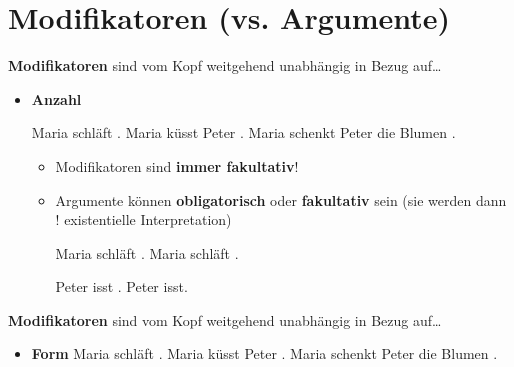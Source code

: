 \section{Modifikatoren (vs. Argumente)}

\begin{frame}

\textbf{Modifikatoren} sind vom Kopf weitgehend unabhängig in Bezug auf\dots

\begin{itemize}
	\item \textbf{Anzahl}

\eal 
\ex Maria schläft \alertred{[heute] [im Zimmer] [unruhig]}.
\ex Maria küsst Peter \alertred{[heute] [im Zimmer] [unruhig]}.
\ex Maria schenkt Peter die Blumen \alertred{[heute] [im Zimmer] [unruhig]}.
\zl

	\begin{itemize}
		\item Modifikatoren sind \textbf{immer fakultativ}!
		\item Argumente können \textbf{obligatorisch} oder \textbf{fakultativ} sein (sie werden dann ! \ras existentielle Interpretation)
		
		\eal 
		\ex Maria schläft \alertred{[heute] [im Zimmer]}.
		\ex Maria schläft \alertred{[im Zimmer]}. 
		\zl
		
		\eal 
		\ex Peter isst .
		\ex Peter isst. 
		\zl
		
	\end{itemize}

\end{itemize}

\end{frame}


\begin{frame}

\textbf{Modifikatoren} sind vom Kopf weitgehend unabhängig in Bezug auf\dots

\begin{itemize}
	
	\item \textbf{Form}
\eal
\ex Maria schläft .
\ex Maria küsst Peter .
\ex Maria schenkt Peter die Blumen .
\zl

\end{itemize}

\end{frame}


